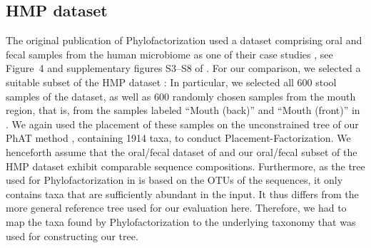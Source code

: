 

\subsection{HMP dataset}
\label{ch:Factorization:sec:Evaluation:sub:HMPDataset}

The original publication of Phylofactorization used a dataset comprising oral and fecal samples from the human microbiome
as one of their case studies \cite{Caporaso2011}, see Figure~4 and supplementary figures S3--S8 of \cite{Washburne2017a}.
For our comparison, we selected a suitable subset of the \ac{HMP} dataset \cite{Huttenhower2012,Methe2012}:
In particular, we selected all \num{600} stool samples of the dataset,
as well as \num{600} randomly chosen samples from the mouth region,
that is, from the samples labeled ``Mouth (back)'' and ``Mouth (front)'' in .
We again used the placement of these samples on the unconstrained  tree
of our \acf{PhAT} method \cite{Czech2018}, containing \num{1 914} taxa, to conduct Placement-Factorization.
We henceforth assume that the oral/fecal dataset of \cite{Caporaso2011}
and our oral/fecal subset of the \ac{HMP} dataset exhibit comparable sequence compositions.
Furthermore, as the tree used for Phylofactorization in \cite{Washburne2017a} is based on the OTUs of the sequences,
it only contains taxa that are sufficiently abundant in the input.
It thus differs from the more general reference tree used for our evaluation here.
Therefore, we had to map the taxa found by Phylofactorization
to the underlying  taxonomy \cite{Quast2013,Yilmaz2014} that was used for constructing our tree.

